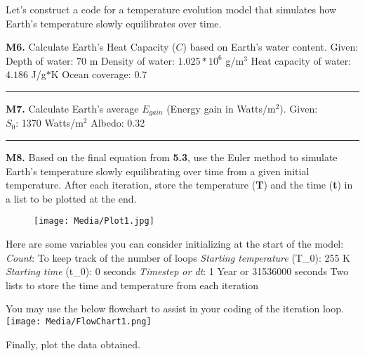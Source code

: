\documentclass[
  letterpaper,
  DIV=11,
  numbers=noendperiod]{scrartcl}
\begin{document}
\begin{tcolorbox}[enhanced jigsaw, titlerule=0mm, title={Modelling Questions}, arc=.35mm, breakable, colback=white, toprule=.15mm, colframe=quarto-callout-caution-color-frame, opacityback=0, bottomtitle=1mm, coltitle=black, toptitle=1mm, rightrule=.15mm, colbacktitle=quarto-callout-caution-color!10!white, bottomrule=.15mm, opacitybacktitle=0.6, leftrule=.75mm, left=2mm]

Let's construct a code for a temperature evolution model that simulates
how Earth's temperature slowly equilibrates over time.

\textbf{M6.} Calculate Earth's Heat Capacity (\(C\)) based on Earth's
water content. Given:\\
Depth of water: \(70\) m Density of water: \(1.025 * 10^6\) g/m\(^3\)
Heat capacity of water: \(4.186\) J/g\(*\)K Ocean coverage: \(0.7\)

\begin{center}\rule{0.5\linewidth}{0.5pt}\end{center}

\textbf{M7.} Calculate Earth's average \(E_{gain}\) (Energy gain in
Watts/m\(^2\)). Given:\\
\(S_0\): 1370 Watts/m\(^2\) Albedo: 0.32

\begin{center}\rule{0.5\linewidth}{0.5pt}\end{center}

\textbf{M8.} Based on the final equation from \textbf{5.3}, use the
Euler method to simulate Earth's temperature slowly equilibrating over
time from a given initial temperature. After each iteration, store the
temperature (\textbf{T}) and the time (\textbf{t}) in a list to be
plotted at the end.

\begin{figure}[H]

{\centering \texttt{[image: Media/Plot1.jpg]}

}

\end{figure}

Here are some variables you can consider initializing at the start of
the model: \emph{Count}: To keep track of the number of loops
\emph{Starting temperature} (T\_0): 255 K \emph{Starting time} (t\_0): 0
seconds \emph{Timestep or dt}: 1 Year or 31536000 seconds Two lists to
store the time and temperature from each iteration

You may use the below flowchart to assist in your coding of the
iteration loop.
\texttt{[image: Media/FlowChart1.png]}

Finally, plot the data obtained.

\end{tcolorbox}
\end{document}
